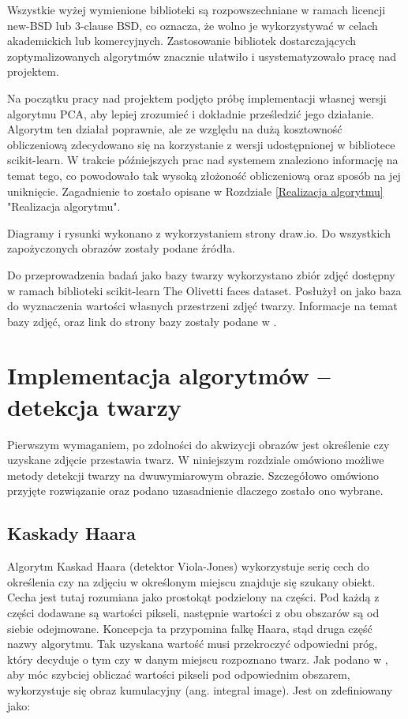 \documentclass[oneside, eng]{mgr}
\begin{document}
Wszystkie wyżej wymienione biblioteki są rozpowszechniane w ramach licencji new-BSD lub 3-clause BSD, co oznacza, że wolno je wykorzystywać w celach akademickich lub komercyjnych. Zastosowanie bibliotek dostarczających zoptymalizowanych algorytmów znacznie ułatwiło i usystematyzowało pracę nad projektem.

Na początku pracy nad projektem podjęto próbę implementacji własnej wersji algorytmu PCA, aby lepiej zrozumieć i dokładnie prześledzić jego działanie. Algorytm ten działał poprawnie, ale ze względu na dużą kosztowność obliczeniową zdecydowano się na korzystanie z wersji udostępnionej w bibliotece scikit-learn. W trakcie późniejszych prac nad systemem znaleziono informację na temat tego, co powodowało tak wysoką złożoność obliczeniową oraz sposób na jej uniknięcie. Zagadnienie to zostało opisane w Rozdziale \ref{Realizacja algorytmu} "Realizacja algorytmu".

Diagramy i rysunki wykonano z wykorzystaniem strony draw.io. Do wszystkich zapożyczonych obrazów zostały podane źródła.

Do przeprowadzenia badań jako bazy twarzy wykorzystano zbiór zdjęć dostępny w ramach biblioteki scikit-learn The Olivetti faces dataset. Posłużył on jako baza do wyznaczenia wartości własnych przestrzeni zdjęć twarzy. Informacje na temat bazy zdjęć, oraz link do strony bazy zostały podane w \cite{Olivetti faces}.

\newpage

\chapter{Implementacja algorytmów – detekcja twarzy}

Pierwszym wymaganiem, po zdolności do akwizycji obrazów jest określenie czy uzyskane zdjęcie przestawia twarz. W niniejszym rozdziale omówiono możliwe metody detekcji twarzy na dwuwymiarowym obrazie. Szczegółowo omówiono przyjęte rozwiązanie oraz podano uzasadnienie dlaczego zostało ono wybrane.

\section{Kaskady Haara}
Algorytm Kaskad Haara (detektor Viola-Jones) wykorzystuje serię cech do określenia czy na zdjęciu w określonym miejscu znajduje się szukany obiekt. Cecha jest tutaj rozumiana jako prostokąt podzielony na części. Pod każdą z części dodawane są wartości pikseli, następnie wartości z obu obszarów są od siebie odejmowane. Koncepcja ta przypomina falkę Haara, stąd druga część nazwy algorytmu. Tak uzyskana wartość musi przekroczyć odpowiedni próg, który decyduje o tym czy w danym miejscu rozpoznano twarz. Jak podano w \cite{Kaskada Haara}, aby móc szybciej obliczać wartości pikseli pod odpowiednim obszarem, wykorzystuje się obraz kumulacyjny (ang. integral image). Jest on zdefiniowany jako:
\end{document}
